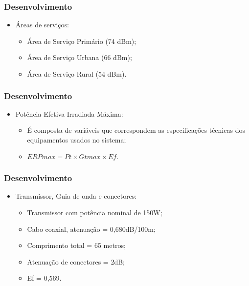 \documentclass{beamer}
\begin{document}
       \begin{frame}
    
      \frametitle{Desenvolvimento}
      
      
      \begin{itemize}

         \item  Áreas de serviços:
          
          
	\begin{itemize}
	

	  \item Área de Serviço Primário (74 dBm);
	  \item Área de Serviço Urbana (66 dBm);
	  \item Área de Serviço Rural (54 dBm).

      
      \end{itemize}
   \end{itemize}
    \end{frame}
      
          \begin{frame}
       
    
      \frametitle{Desenvolvimento}
      
      \begin{itemize}
     \item Potência Efetiva Irradiada Máxima:

      \begin{itemize}
       \item É composta de variáveis que correspondem as especificações técnicas dos equipamentos usados no sistema;
       
       \item $ERPmax = Pt \times Gtmax \times Ef$.
      \end{itemize}
    \end{itemize}
    \end{frame}
    
    \begin{frame}
    
      \frametitle{Desenvolvimento}
      
      
            \begin{itemize}

         \item  Transmissor, Guia de onda e conectores:
                
          
	\begin{itemize}
	

	  \item Transmissor com potência nominal de 150W;
	  \item Cabo coaxial, atenuação = 0,680dB/100m;
	  \item Comprimento total = 65 metros;
	  \item Atenuação de conectores = 2dB;
	  \item Ef = 0,569.
      
      \end{itemize}
   \end{itemize}
    \end{frame}
      
\end{document}
